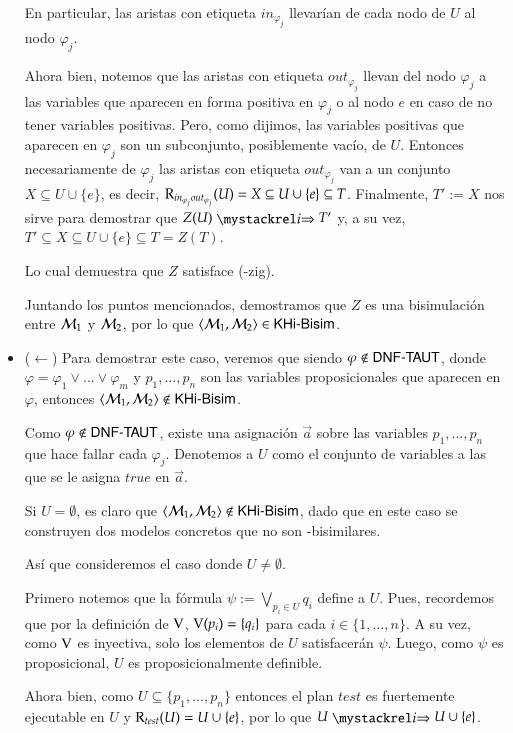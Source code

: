 \begin{demostracion}
\begin{itemize}
    En particular, las aristas con etiqueta $in_{\varphi_j}$ llevarían de cada nodo de $U$ al nodo $\varphi_j$.
    
    Ahora bien, notemos que las aristas con etiqueta $out_{\varphi_j}$ llevan del nodo $\varphi_j$ a las variables que aparecen en forma positiva en $\varphi_j$ o al nodo $e$ en caso de no tener variables positivas. Pero, como dijimos, las variables positivas que aparecen en $\varphi_j$ son un subconjunto, posiblemente vacío, de $U$. Entonces necesariamente de $\varphi_j$ las aristas con etiqueta $out_{\varphi_j}$ van a un conjunto $X \subseteq U \cup \{e\}$, es decir, $\mathrm{R}_{in_{\varphi_j}out_{\varphi_j}}(U) = X \subseteq U \cup \{e\} \subseteq T$. Finalmente, $T' := X$ nos sirve para demostrar que $Z(U) \ultsExecAgi T'$ y, a su vez, $T' \subseteq X \subseteq U \cup \{e\} \subseteq T = Z(T)$.

    Lo cual demuestra que $Z$ satisface (\KHilogic-zig). 

    Juntando los puntos mencionados, demostramos que $Z$ es una bisimulación entre $\mathcal{M}_1$ y $\mathcal{M}_2$, por lo que $\langle \mathcal{M}_1,\mathcal{M}_2 \rangle \in \rm\textsf{KHi-Bisim}$. 

    \item ($\leftarrow$) Para demostrar este caso, veremos que siendo $\varphi \notin \rm\textsf{DNF-TAUT}$, donde $\varphi = \varphi_1 \vee ... \vee \varphi_m$ y $p_1,...,p_n$ son las variables proposicionales que aparecen en $\varphi$, entonces $\langle \mathcal{M}_1,\mathcal{M}_2 \rangle \notin \rm\textsf{KHi-Bisim}$.

    Como $\varphi \notin \rm\textsf{DNF-TAUT}$, existe una asignación $\overrightarrow{a}$ sobre las variables $p_1,...,p_n$ que hace fallar cada $\varphi_j$. Denotemos a $U$ como el conjunto de variables a las que se le asigna $true$ en $\overrightarrow{a}$.

    Si $U = \emptyset$, es claro que $\langle \mathcal{M}_1,\mathcal{M}_2 \rangle \notin \rm\textsf{KHi-Bisim}$, dado que en este caso se construyen dos modelos concretos que no son \KHilogic-bisimilares.

    Así que consideremos el caso donde $U \neq \emptyset$.
    
    Primero notemos que la fórmula $\psi := \bigvee\limits_{p_i \in U} q_i$ define a $U$. Pues, recordemos que por la definición de $\mathrm{V}$, $\mathrm{V}(p_i) = \{q_i\}$ para cada $i \in \{1,...,n\}$. A su vez, como $\mathrm{V}$ es inyectiva, solo los elementos de $U$ satisfacerán $\psi$. Luego, como $\psi$ es proposicional, $U$ es proposicionalmente definible.

    Ahora bien, como $U \subseteq \{p_1,...,p_n\}$ entonces el plan $test$ es fuertemente ejecutable en $U$ y $\mathrm{R}_{test}(U) = U \cup \{e\}$, por lo que $U \ultsExecAgi U \cup \{e\}$.
    

\end{itemize}
\end{demostracion}
